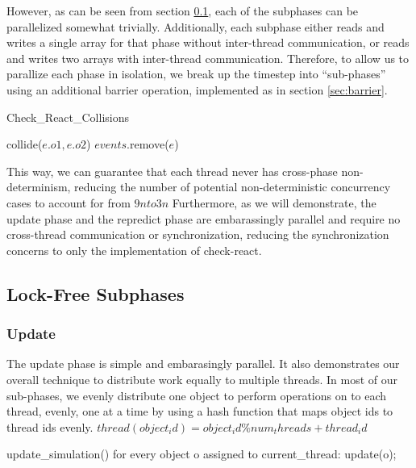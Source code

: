 \documentclass[conference]{IEEEtran}
\begin{document}
However, as can be seen from section \ref{sec:subphase}, each of the subphases can be parallelized somewhat trivially.  Additionally, each subphase either reads and writes
a single array for that phase without inter-thread communication, or reads and writes two arrays with inter-thread communication.  Therefore, to allow us to parallize each
phase in isolation, we break up the timestep into ``sub-phases'' using an additional barrier operation, implemented as in section \ref{sec:barrier}.  

\begin{algorithm}
\caption{Check\_React\_Collisions}
\begin{algorithmic}
\STATE {}
	\STATE {}
		\STATE {}
		\STATE collide($e.o1,e.o2$)
	\ENDIF
	\STATE {}
	\STATE $events$.remove($e$)
\ENDFOR
\end{algorithmic}
\end{algorithm}

This way, we can guarantee that each thread never has cross-phase non-determinism, reducing the number of potential non-deterministic concurrency cases to account for from $9n to 3n$
Furthermore, as we will demonstrate, the update phase and the repredict phase are embarassingly parallel and require no cross-thread communication or synchronization,
reducing the synchronization concerns to only the implementation of check-react.

\subsection{Lock-Free Subphases}
\label{sec:subphase}
\subsubsection{Update}

The update phase is simple and embarasingly parallel.  It also demonstrates our overall technique to distribute work equally to multiple threads.  In most of our sub-phases,
we evenly distribute one object to perform operations on to each thread, evenly, one at a time by using a hash function that maps object ids to thread ids evenly. 
$thread(object_id)=object_id \% num_threads+thread_id$
\begin{verbatimtab}[3]
update_simulation()
{
   for every object o assigned to current_thread:
      update(o);
}
\end{verbatimtab}
\end{document}

